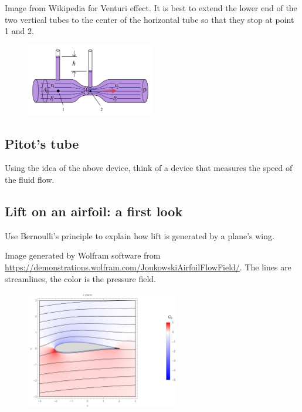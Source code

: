 \documentclass[11pt,letterpaper]{report}
\begin{document}
Image from Wikipedia for Venturi effect. It is best to extend the lower end of the two vertical tubes to the center of the horizontal tube so that they stop at point 1 and 2.
\begin{figure}[H]
    \centering
    \includegraphics[width=0.5\textwidth]{Session_4/figs/Venturi_wiki}
\end{figure}

\subsection{Pitot's tube}
Using the idea of the above device, think of a device that measures the speed of the fluid flow.

\subsection{Lift on an airfoil: a first look}
Use Bernoulli's principle to explain how lift is generated by a plane's wing.

Image generated by Wolfram software from \url{https://demonstrations.wolfram.com/JoukowskiAirfoilFlowField/}. The lines are streamlines, the color is the pressure field.
\begin{figure}[H]
    \centering
    \includegraphics[width=0.6\textwidth]{Session_4/figs/Airfoil}
\end{figure}
\end{document}
